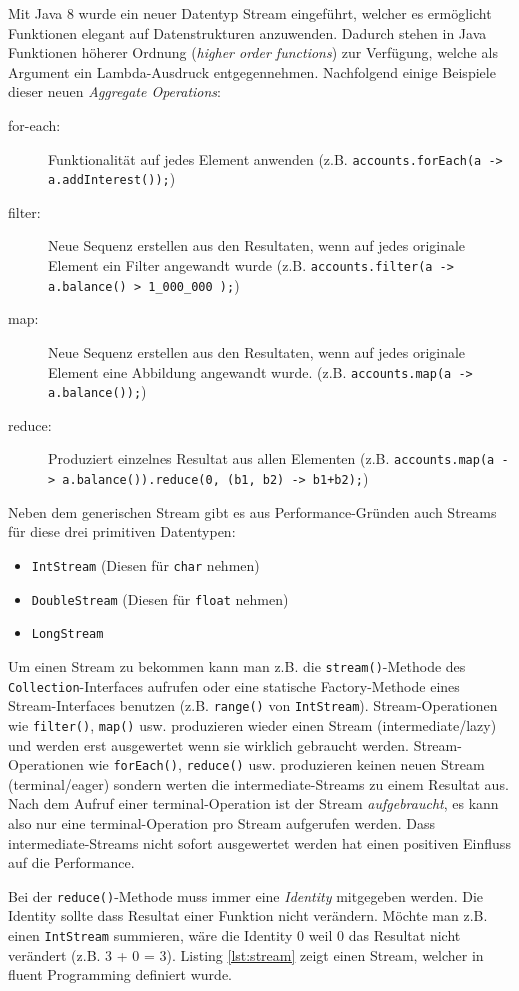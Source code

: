 Mit Java 8 wurde ein neuer Datentyp Stream eingeführt, welcher es ermöglicht Funktionen elegant auf Datenstrukturen anzuwenden. Dadurch stehen in Java Funktionen höherer Ordnung (\textit{higher order functions}) zur Verfügung, welche als Argument ein Lambda-Ausdruck entgegennehmen. Nachfolgend einige Beispiele dieser neuen \textit{Aggregate Operations}:
\begin{description}
	\item[for-each:] Funktionalität auf jedes Element anwenden (z.B. \verb|accounts.forEach(a -> a.addInterest());|)
	\item[filter:] Neue Sequenz erstellen aus den Resultaten, wenn auf jedes originale Element ein Filter angewandt wurde (z.B. \verb|accounts.filter(a -> a.balance() > 1_000_000 );|)
	\item[map:] Neue Sequenz erstellen aus den Resultaten, wenn auf jedes originale Element eine Abbildung angewandt wurde. (z.B. \verb|accounts.map(a -> a.balance());|)
	\item[reduce:] Produziert einzelnes Resultat aus allen Elementen (z.B. \verb|accounts.map(a -> a.balance()).reduce(0, (b1, b2) -> b1+b2);|)
\end{description}
Neben dem generischen Stream gibt es aus Performance-Gründen auch Streams für diese drei primitiven Datentypen:
\begin{itemize}
	\item \verb|IntStream| (Diesen für \verb|char| nehmen)
	\item \verb|DoubleStream| (Diesen für \verb|float| nehmen)
	\item \verb|LongStream|
\end{itemize}
Um einen Stream zu bekommen kann man z.B. die \verb|stream()|-Methode des \verb|Collection|-Interfaces aufrufen oder eine statische Factory-Methode eines Stream-Interfaces benutzen (z.B. \verb|range()| von \verb|IntStream|). Stream-Operationen wie \verb|filter()|, \verb|map()| usw. produzieren wieder einen Stream (intermediate/lazy) und werden erst ausgewertet wenn sie wirklich gebraucht werden. Stream-Operationen wie \verb|forEach()|, \verb|reduce()| usw. produzieren keinen neuen Stream (terminal/eager) sondern werten die intermediate-Streams zu einem Resultat aus. Nach dem Aufruf einer terminal-Operation ist der Stream \textit{aufgebraucht}, es kann also nur eine terminal-Operation pro Stream aufgerufen werden. Dass intermediate-Streams nicht sofort ausgewertet werden hat einen positiven Einfluss auf die Performance. 

Bei der \verb|reduce()|-Methode muss immer eine \textit{Identity} mitgegeben werden. Die Identity sollte dass Resultat einer Funktion nicht verändern. Möchte man z.B. einen \verb|IntStream| summieren, wäre die Identity 0 weil 0 das Resultat nicht verändert (z.B. 3 + 0 = 3). Listing \ref{lst:stream} zeigt einen Stream, welcher in fluent Programming definiert wurde.


